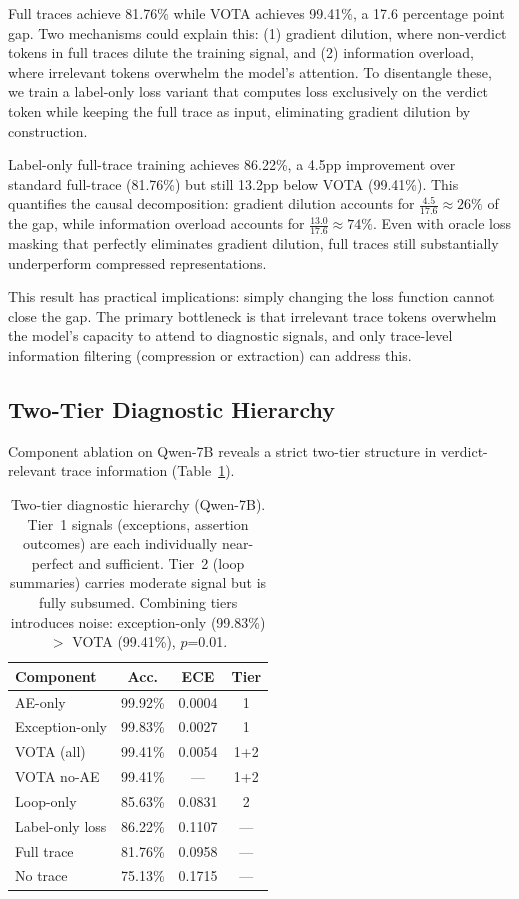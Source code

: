 \documentclass[11pt,a4paper]{article}
\begin{document}
Full traces achieve 81.76\% while VOTA achieves 99.41\%, a 17.6 percentage point gap. Two mechanisms could explain this: (1) gradient dilution, where non-verdict tokens in full traces dilute the training signal, and (2) information overload, where irrelevant tokens overwhelm the model's attention. To disentangle these, we train a label-only loss variant that computes loss exclusively on the verdict token while keeping the full trace as input, eliminating gradient dilution by construction.

Label-only full-trace training achieves 86.22\%, a 4.5pp improvement over standard full-trace (81.76\%) but still 13.2pp below VOTA (99.41\%). This quantifies the causal decomposition: gradient dilution accounts for $\frac{4.5}{17.6} \approx 26\%$ of the gap, while information overload accounts for $\frac{13.0}{17.6} \approx 74\%$. Even with oracle loss masking that perfectly eliminates gradient dilution, full traces still substantially underperform compressed representations.

This result has practical implications: simply changing the loss function cannot close the gap. The primary bottleneck is that irrelevant trace tokens overwhelm the model's capacity to attend to diagnostic signals, and only trace-level information filtering (compression or extraction) can address this.

\subsection{Two-Tier Diagnostic Hierarchy}
\label{sec:hierarchy}

Component ablation on Qwen-7B reveals a strict two-tier structure in verdict-relevant trace information (Table~\ref{tab:hierarchy}).

\begin{table}[t]
\centering
\small
\begin{tabular}{lccc}
\toprule
\textbf{Component} & \textbf{Acc.} & \textbf{ECE} & \textbf{Tier} \\
\midrule
AE-only & 99.92\% & 0.0004 & 1 \\
Exception-only & 99.83\% & 0.0027 & 1 \\
VOTA (all) & 99.41\% & 0.0054 & 1+2 \\
VOTA no-AE & 99.41\% & --- & 1+2 \\
Loop-only & 85.63\% & 0.0831 & 2 \\
Label-only loss & 86.22\% & 0.1107 & --- \\
Full trace & 81.76\% & 0.0958 & --- \\
No trace & 75.13\% & 0.1715 & --- \\
\bottomrule
\end{tabular}
\caption{Two-tier diagnostic hierarchy (Qwen-7B). Tier~1 signals (exceptions, assertion outcomes) are each individually near-perfect and sufficient. Tier~2 (loop summaries) carries moderate signal but is fully subsumed. Combining tiers introduces noise: exception-only (99.83\%) $>$ VOTA (99.41\%), $p$=0.01.}
\label{tab:hierarchy}
\end{table}
\end{document}
